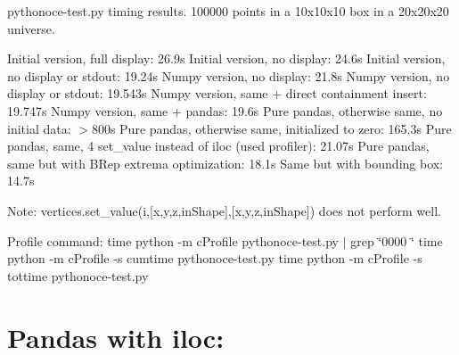 pythonoce-\/test.\+py timing results. 100000 points in a 10x10x10 box in a 20x20x20 universe.

Initial version, full display\+: 26.\+9s Initial version, no display\+: 24.\+6s Initial version, no display or stdout\+: 19.\+24s Numpy version, no display\+: 21.\+8s Numpy version, no display or stdout\+: 19.\+543s Numpy version, same + direct containment insert\+: 19.\+747s Numpy version, same + pandas\+: 19.\+6s Pure pandas, otherwise same, no initial data\+: $>$800s Pure pandas, otherwise same, initialized to zero\+: 165.\+3s Pure pandas, same, 4 set\+\_\+value instead of iloc (used profiler)\+: 21.\+07s Pure pandas, same but with B\+Rep extrema optimization\+: 18.\+1s Same but with bounding box\+: 14.\+7s

Note\+: vertices.\+set\+\_\+value(i,\mbox{[}\textquotesingle{}x\textquotesingle{},\textquotesingle{}y\textquotesingle{},\textquotesingle{}z\textquotesingle{},\textquotesingle{}in\+Shape\textquotesingle{}\mbox{]},\mbox{[}x,y,z,in\+Shape\mbox{]}) does not perform well.

Profile command\+: time python -\/m c\+Profile pythonoce-\/test.\+py $\vert$ grep \char`\"{}0000 \char`\"{} time python -\/m c\+Profile -\/s cumtime pythonoce-\/test.\+py time python -\/m c\+Profile -\/s tottime pythonoce-\/test.\+py

\section*{Pandas with iloc\+: }

